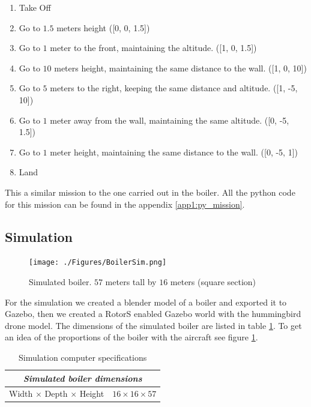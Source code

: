     \begin{enumerate}
      \item Take Off
      \item Go to $1.5$ meters height ([0, 0, 1.5])
      \item Go to $1$ meter to the front, maintaining the altitude. ([1, 0, 1.5])
      \item Go to $10$ meters height, maintaining the same distance to the wall. ([1, 0, 10])
      \item Go to $5$ meters to the right, keeping the same distance and altitude. ([1, -5, 10])
      \item Go to $1$ meter away from the wall, maintaining the same altitude. ([0, -5, 1.5])
      \item Go to $1$ meter height, maintaining the same distance to the wall. ([0, -5, 1])
      \item Land
    \end{enumerate}

    This a similar mission to the one carried out in the boiler. All the python code for this mission can be found in the appendix \ref{app1:py_mission}.

  \pagebreak

  \subsection{Simulation} \label{ch_5:subsect:exp_simulation}

    \begin{figure}[!h]
      \centering
      \texttt{[image: ./Figures/BoilerSim.png]}
      \caption{Simulated boiler. $57$ meters tall by $16$ meters (square section)}
      \label{ch_5:fig:boiler_sim}
    \end{figure}

    For the simulation we created a blender model of a boiler and exported it to Gazebo, then we created a RotorS enabled Gazebo world with the hummingbird drone model. The dimensions of the simulated boiler are listed in table \ref{ch_5:table:boiler_sim_dims}. To get an idea of the proportions of the boiler with the aircraft see figure \ref{ch_5:fig:boiler_sim}.  

    \begin{table}[!h]
      \centering
      \begin{tabular}{lr} \toprule
        \multicolumn{2}{c}{\textit{Simulated boiler dimensions}}        \\ \midrule
        Width $\times$ Depth $\times$ Height & $16 \times 16 \times 57$ \\ \bottomrule
        \hline
      \end{tabular}
      \caption{Simulation computer specifications}
      \label{ch_5:table:boiler_sim_dims}
    \end{table}

